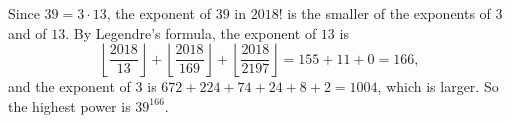 Since $39=3\cdot13$, the exponent of $39$ in $2018!$ is the smaller of the exponents of $3$ and of $13$. By Legendre's formula, the exponent of $13$ is
\[\left\lfloor\dfrac{2018}{13}\right\rfloor+\left\lfloor\dfrac{2018}{169}\right\rfloor+\left\lfloor\dfrac{2018}{2197}\right\rfloor=155+11+0=166,\]
and the exponent of $3$ is $672+224+74+24+8+2=1004$, which is larger. So the highest power is $\boxed{39^{166}}$.
